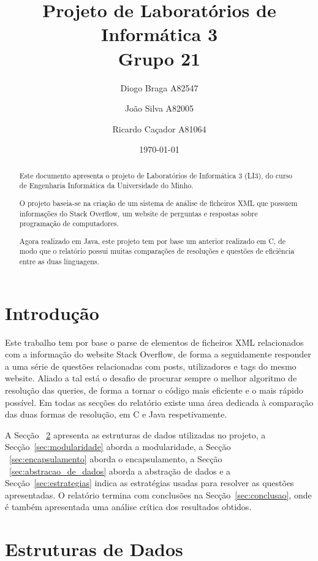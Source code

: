 \documentclass[a4paper]{article}
\title{Projeto de Laboratórios de Informática 3\\Grupo 21}
\author{Diogo Braga A82547 \and João Silva A82005 \and Ricardo Caçador A81064}
\date{\today}
\begin{document}
\maketitle

\begin{abstract}
Este documento apresenta o projeto de Laboratórios de Informática
3 (LI3), do curso de Engenharia Informática da Universidade
do Minho.

O projeto baseia-se na criação de um sistema de análise de ficheiros 
XML que possuem informações do Stack Overflow, um website de perguntas
e respostas sobre programação de computadores.

Agora realizado em Java, este projeto tem por base um anterior realizado em
C, de modo que o relatório possui muitas comparações de resoluções e
questões de eficiência entre as duas linguagens.

\end{abstract}

\tableofcontents

\section{Introdução}
\label{sec:intro}

Este trabalho tem por base o parse de elementos de ficheiros XML
relacionados com a informação do website Stack Overflow, de forma
a seguidamente responder a uma série de questões relacionadas com
posts, utilizadores e tags do mesmo website. Aliado a tal está o desafio
de procurar sempre o melhor algoritmo de resolução das queries, de 
forma a tornar o código mais eficiente e o mais rápido possível.
Em todas as secções do relatório existe uma área dedicada à comparação
das duas formas de resolução, em C e Java respetivamente.

A Secção ~\ref{sec:estruturas} apresenta as estruturas de dados utilizadas 
no projeto, a Secção~\ref{sec:modularidade} aborda a modularidade, 
a Secção ~\ref{sec:encapsulamento} aborda o encapsulamento, a 
Secção ~\ref{sec:abstracao_de_dados} aborda a abstração de dados e a 
Secção~\ref{sec:estrategias} indica as estratégias usadas para resolver 
as questões apresentadas. O relatório termina com conclusões na
Secção~\ref{sec:conclusao}, onde é também apresentada uma análise
crítica dos resultados obtidos.

\section{Estruturas de Dados}
\label{sec:estruturas}
\end{document}
